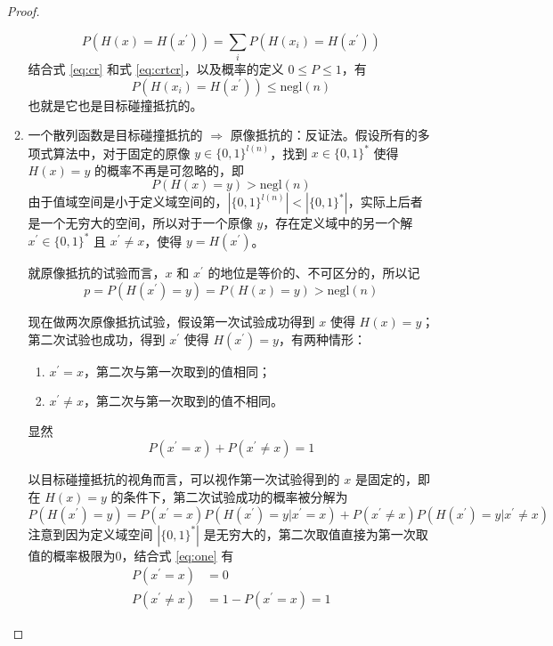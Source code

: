 \documentclass{sjtuarticle}
\begin{document}
\begin{enumerate}
\begin{proof}
\begin{enumerate}
            \begin{equation}\label{eq:crtcr}
                P\left(H(x)=H(x^\prime)\right)=\sum_{i} P(H(x_i)=H(x^\prime))
            \end{equation}
            结合式 \eqref{eq:cr} 和式 \eqref{eq:crtcr}，以及概率的定义 $0\leq P\leq 1$，有
            \begin{equation}
                P(H(x_i)=H(x^\prime)) \leq \text{negl}(n)
            \end{equation}
            也就是它也是目标碰撞抵抗的。
            \item 一个散列函数是目标碰撞抵抗的 $\Rightarrow$ 原像抵抗的：反证法。假设所有的多项式算法中，对于固定的原像 $y\in \{0,1\}^{l(n)}$，找到 $x\in \{0,1\}^*$ 使得 $H(x)=y$ 的概率不再是可忽略的，即
            \begin{equation}\label{eq:a1}
                P(H(x)=y)>\text{negl}(n)
            \end{equation}
            由于值域空间是小于定义域空间的，$|\{0,1\}^{l(n)}|<|\{0,1\}^*|$，实际上后者是一个无穷大的空间，所以对于一个原像 $y$，存在定义域中的另一个解 $x^\prime\in \{0,1\}^*$ 且 $x^\prime\neq x$，使得 $y=H(x^\prime)$。
            
            就原像抵抗的试验而言，$x$ 和 $x^\prime$ 的地位是等价的、不可区分的，所以记
            \begin{equation}\label{eq:a2}
                p=P(H(x^\prime)=y)=P(H(x)=y)>\text{negl}(n)
            \end{equation}

            现在做两次原像抵抗试验，假设第一次试验成功得到 $x$ 使得 $H(x)=y$；第二次试验也成功，得到 $x^\prime$ 使得 $H(x^\prime)=y$，有两种情形：

            \begin{enumerate}
                \item $x^\prime=x$，第二次与第一次取到的值相同；
                \item $x^\prime\neq x$，第二次与第一次取到的值不相同。
            \end{enumerate}
            显然
            \begin{equation}\label{eq:one}
                P(x^\prime=x)+P(x^\prime\neq x)=1
            \end{equation}

            以目标碰撞抵抗的视角而言，可以视作第一次试验得到的 $x$ 是固定的，即在 $H(x)=y$ 的条件下，第二次试验成功的概率被分解为
            \begin{equation}\label{eq:decomp}
                P(H(x^\prime)=y)=P(x^\prime=x)P\left(H(x^\prime)=y|x^\prime=x\right)+P(x^\prime\neq x)P\left(H(x^\prime)=y|x^\prime\neq x\right)
            \end{equation}
            注意到因为定义域空间 $|\{0,1\}^*|$ 是无穷大的，第二次取值直接为第一次取值的概率极限为0，结合式 \eqref{eq:one} 有
            \begin{align*}
                P(x^\prime=x)&=0\\
                P(x^\prime\neq x)&=1-P(x^\prime=x)=1
            \end{align*}
            

\end{enumerate}
\end{proof}
\end{enumerate}
\end{document}

